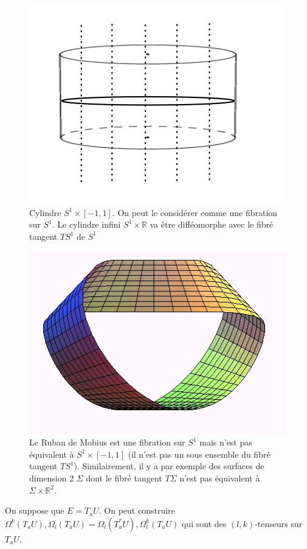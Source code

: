 \documentclass[french]{article}
\theoremstyle{definition}
\newcommand{\R}{\mathbb{R}}
\begin{document}
\begin{figure}[h!]
  \centering
  \includegraphics[scale=0.3]{figures/cylindre_tens.png}
  \caption{Cylindre \(S ^{1} \times [-1,1]\). On peut  le considérer comme une fibration sur $S ^{1}$. Le cylindre infini  \(S ^{1} \times \R\) va \^etre diff\'eomorphe avec le fibr\'e tangent $TS^1$ de $S^1$}
  \label{}
\end{figure}

\begin{figure}[h!]
  \centering
  \includegraphics[scale=0.3]{figures/ruban_mobius.jpg}
  \caption{Le Ruban de Mobius est une fibration sur $S^1$ mais n'est pas équivalent à \(S ^{1} \times [-1, 1]\) (il n'est pas un sous ensemble du fibr\'e tangent $TS^1$). Similairement, il y a  par exemple des surfaces de dimension 2 $\Sigma$  dont le fibr\'e tangent $T\Sigma$ n'est pas \'equivalent \`a $\Sigma \times \R^2$.}
  \label{}
\end{figure}


On suppose que \(E= T_a U\). On peut construire \(\Omega ^{k}(T_a U), \Omega _{l}(T_a U) = \Omega _{l}(T_a ^{*} U), \Omega _{l}^{k}(T_a U)\) qui sont des \((l,k)\)-tenseurs sur \(T_a U\).
\end{document}
